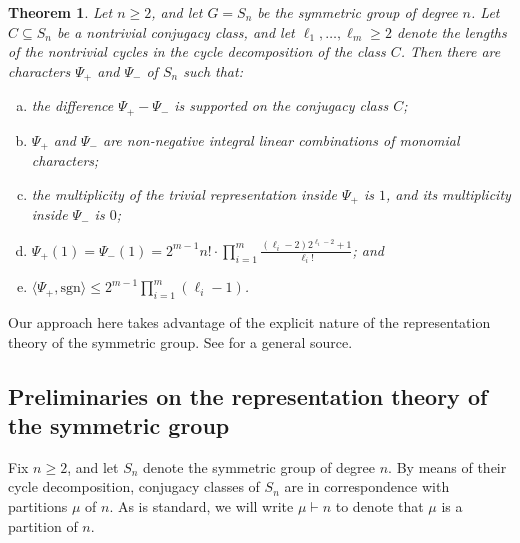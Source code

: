 \documentclass[12pt]{amsart}
\newtheorem{theorem}{Theorem}
\theoremstyle{definition} \newtheorem{definition}[theorem]{Definition}
\theoremstyle{example} \newtheorem{example}[theorem]{Example}
\theoremstyle{remark} \newtheorem{remark}{Remark}[theorem]
\numberwithin{equation}{section}
\numberwithin{theorem}{section}
\renewcommand{\leq}{\leqslant}
\renewcommand{\geq}{\geqslant}
\begin{document}
	\begin{theorem} \label{thm:product-of-cycles-characters}
		Let $n \geq 2$, and let $G = S_n$ be the symmetric group of degree $n$.  Let $C \subseteq S_n$ be a nontrivial conjugacy class, and let $\ell_1, \dots, \ell_m \geq 2$ denote the lengths of the nontrivial cycles in the cycle decomposition of the class $C$.  Then there are characters $\Psi_+$ and $\Psi_-$ of $S_n$ such that:
			\begin{enumerate}[a)]
				\item the difference $\Psi_+ - \Psi_-$ is supported on the conjugacy class $C$;
				\item $\Psi_+$ and $\Psi_-$ are non-negative integral linear combinations of monomial characters;
				\item the multiplicity of the trivial representation inside $\Psi_+$ is $1$, and its multiplicity inside $\Psi_-$ is $0$;
				\item $\Psi_+(1) = \Psi_-(1) = 2^{m-1} n! \cdot \prod_{i=1}^m \frac{(\ell_i-2)2^{\ell_i-2} + 1}{\ell_i!}$; and
				\item $\langle \Psi_+, \mathrm{sgn} \rangle \leq 2^{m-1} \prod_{i=1}^m (\ell_i-1)$.
			\end{enumerate}
	\end{theorem}
	
	Our approach here takes advantage of the explicit nature of the representation theory of the symmetric group.  See \cite[Chapter 4]{FultonHarris} for a general source.

\subsection{Preliminaries on the representation theory of the symmetric group}
	
	Fix $n \geq 2$, and let $S_n$ denote the symmetric group of degree $n$.  By means of their cycle decomposition, conjugacy classes of $S_n$ are in correspondence with partitions $\mu$ of $n$.  As is standard, we will write $\mu \vdash n$ to denote that $\mu$ is a partition of $n$.  
	
\end{document}
